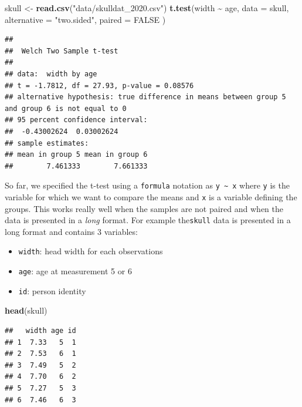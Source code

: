 \documentclass[
  12pt,
]{book}
\newenvironment{Shaded}{\begin{snugshade}}{\end{snugshade}}
\newcommand{\DataTypeTok}[1]{\textcolor[rgb]{0.13,0.29,0.53}{#1}}
\newcommand{\KeywordTok}[1]{\textcolor[rgb]{0.13,0.29,0.53}{\textbf{#1}}}
\newcommand{\NormalTok}[1]{#1}
\newcommand{\OperatorTok}[1]{\textcolor[rgb]{0.81,0.36,0.00}{\textbf{#1}}}
\newcommand{\OtherTok}[1]{\textcolor[rgb]{0.56,0.35,0.01}{#1}}
\newcommand{\StringTok}[1]{\textcolor[rgb]{0.31,0.60,0.02}{#1}}
\providecommand{\tightlist}{%
  \setlength{\itemsep}{0pt}\setlength{\parskip}{0pt}}
\begin{document}
\begin{Shaded}
\begin{Highlighting}[]
\NormalTok{skull \textless{}{-}}\StringTok{ }\KeywordTok{read.csv}\NormalTok{(}\StringTok{"data/skulldat\_2020.csv"}\NormalTok{)}
\KeywordTok{t.test}\NormalTok{(width }\OperatorTok{\textasciitilde{}}\StringTok{ }\NormalTok{age,}
  \DataTypeTok{data =}\NormalTok{ skull,}
  \DataTypeTok{alternative =} \StringTok{"two.sided"}\NormalTok{,}
  \DataTypeTok{paired =} \OtherTok{FALSE}
\NormalTok{)}
\end{Highlighting}
\end{Shaded}

\begin{verbatim}
## 
##  Welch Two Sample t-test
## 
## data:  width by age
## t = -1.7812, df = 27.93, p-value = 0.08576
## alternative hypothesis: true difference in means between group 5 and group 6 is not equal to 0
## 95 percent confidence interval:
##  -0.43002624  0.03002624
## sample estimates:
## mean in group 5 mean in group 6 
##        7.461333        7.661333
\end{verbatim}

So far, we specified the t-test using a \texttt{formula} notation as \texttt{y\ \textasciitilde{}\ x} where \texttt{y} is the variable for which we want to compare the means and \texttt{x} is a variable defining the groups. This works really well when the samples are not paired and when the data is presented in a \emph{long} format. For example the\texttt{skull} data is presented in a long format and contains 3 variables:

\begin{itemize}
\tightlist
\item
  \texttt{width}: head width for each observations
\item
  \texttt{age}: age at measurement 5 or 6
\item
  \texttt{id}: person identity
\end{itemize}

\begin{Shaded}
\begin{Highlighting}[]
\KeywordTok{head}\NormalTok{(skull)}
\end{Highlighting}
\end{Shaded}

\begin{verbatim}
##   width age id
## 1  7.33   5  1
## 2  7.53   6  1
## 3  7.49   5  2
## 4  7.70   6  2
## 5  7.27   5  3
## 6  7.46   6  3
\end{verbatim}
\end{document}
